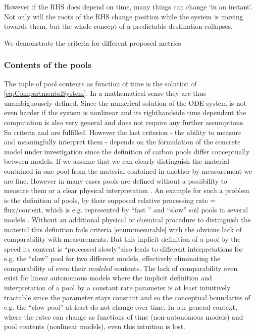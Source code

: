 However if the RHS does depend on time, many things can change `in an instant'. Not only will the roots of the RHS change position while the system is moving towards them, but the whole concept of a predictable destination collapses.

We demonstrate the criteria for different proposed metrics

\subsubsection{Contents of the pools}
The tuple of pool contents as function of time is the solution of \eqref{eq:CompartmentalSystem}.
In a mathematical sense they are thus unambiguousely defined. Since the numerical solution of the ODE system is not even harder if the system is nonlinear and its righthandside time dependent the computation is also very general and does not require any further assumptions.
So criteria  and  are fulfilled. 
However the last criterion - the ability to measure and
meaningfully interpret them - depends on the formulation of the concrete model under investigation since the definition of carbon pools differ conceptually between models. If we assume that we can clearly distinguish the material contained in one pool from the material contained in another by measurement we are fine. 
However in many cases pools are defined without a possibility to measure them or a clear physical interpretation 
\cite{abramoff_millennial_2018}. 
An example for such a problem is the definition of pools, by their supposed relative processing rate = flux/content, which is e.g. represented by 
``fast '' and ``slow'' soil pools in several models \cite{trendy}. 
Without an additional physical or chemical procedure to distinguish the material this definition fails criteria \ref{enum:mesurable} with the obvious lack of comparability with measurements.
But this inplicit definition of a pool by the speed its content is ``processed
slowly''also leads to different interpretations for e.g. the ``slow'' pool for
two different models, effectively eliminating the comparability of even their
\emph{modeled} contents.  
The lack of comparability even exist for linear autonomous models
where the implicit definition and interpretation of a pool by a constant rate
parameter is at least intuitively tractable since the parameter stays constant
and so the conceptual boundaries of e.g. the ``slow pool'' at least do not
change over time.
In our general context, where the rates can change as functions of time (non-autonomous models) and pool contents (nonlinear models), even this intuition is lost. 
